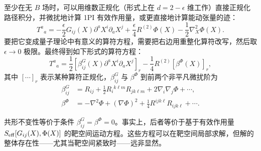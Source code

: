 至少在无 $B$ 场时，可以用维数正规化（形式上在 $d=2-\epsilon$ 维工作）直接正规化路径积分，并微扰地计算 1PI 有效作用量，或更直接地计算能动张量的迹：
\begin{equation}
  \label{eq:4-25}
  T^a{}_a=-\frac{\epsilon}{2}G_{ij}(X)\partial^a X^i\partial_a X^j+\frac{\epsilon}{4}R^{(2)}\Phi(X)-\frac{1}{2}\nabla_X^2\Phi(X).
\end{equation}
要把它变成量子理论中有意义的算符方程，需要把右边用重整化算符改写，然后取 $\epsilon\to0$ 极限。最终得到如下形式的算符方程：
\begin{equation}
  \label{eq:4-26}
  T^a{}_a=\frac{1}{2}\left[\beta^G_{ij}(X)\partial^a X^i\partial_a X^j\right]_r-\frac{1}{4}R^{(2)}\left[\beta^\Phi(X)\right]_r,
\end{equation}
其中 $[\cdots]_r$ 表示某种算符正规化，$\beta^G_{ij}$ 与 $\beta^\Phi$ 到前两个非平凡微扰阶为 \cite{r25}
\begin{equation}
  \label{eq:4-27}
  \begin{aligned}
  \beta^G_{ij}&=R_{ij}+\frac{1}{2}R_i{}^{k\ell m}R_{jk\ell m}+2\nabla_i\nabla_j\Phi+\cdots,\\
  \beta^\Phi&=-\nabla^2\Phi+(\nabla\Phi)^2+\frac{1}{4}R^{ijk\ell}R_{ijk\ell}+\cdots.
  \end{aligned}
\end{equation}


共形不变性等价于条件 $\beta^G_{ij}=\beta^\Phi=0$。事实上，后者等价于基于有效作用量 $S_{\rm eff}[G_{ij}(X),\Phi(X)]$ 的靶空间运动方程。这些方程可以在靶空间局部求解，但解的整体存在性——尤其当靶空间紧致时——远非显然。
